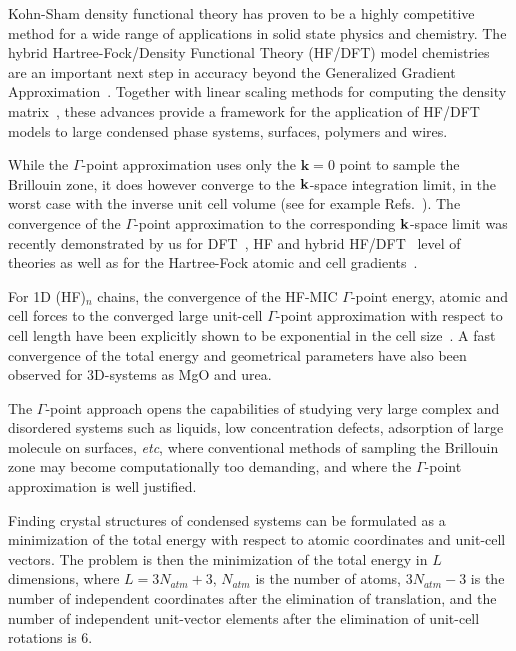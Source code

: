 \documentclass[prl,twocolumn,showpacs,twocolumngrid,superbib]{revtex4}
\begin{document}
Kohn-Sham density functional theory has proven to be a highly 
competitive method for a wide range of applications in solid 
state physics and chemistry.
The hybrid Hartree-Fock/Density Functional Theory (HF/DFT) model chemistries
are an important next step in accuracy beyond the Generalized Gradient
Approximation~\cite{Gill92,Becke93,VBarone96,CAdamo99}. Together with linear
scaling methods for computing the density matrix~\cite{ANiklasson02A,ANiklasson03}, these
advances provide a framework for the application of HF/DFT
models to large condensed phase systems, surfaces, polymers and wires.

While the $\Gamma$-point approximation uses only the $\mathbf{k}=0$ point to sample
the Brillouin zone, it does however converge to the
${\bf k}$-space integration limit, in the worst case with the inverse
unit cell volume (see for example Refs.~\cite{CKittel71,NAshcroft76}).
The convergence of the $\Gamma$-point approximation to
the corresponding ${\bf k}$-space limit was recently
demonstrated by us for DFT~\cite{CTymczak04a}, HF and hybrid
HF/DFT~\cite{CTymczak04b} level of theories as well as for the Hartree-Fock 
atomic and cell gradients~\cite{VWeber05b}.

For 1D (HF)$_n$ chains, the convergence of the HF-MIC $\Gamma$-point energy,
atomic and cell forces to the converged large unit-cell $\Gamma$-point approximation
with respect to cell length have been explicitly shown to be exponential
in the cell size~\cite{VWeber05b}. A fast convergence of the total energy and geometrical parameters
have also been observed for 3D-systems as MgO and urea.

The $\Gamma$-point approach opens the capabilities of studying very large
complex and disordered systems such as liquids, low concentration defects, adsorption of
large molecule on surfaces, {\em etc}, where conventional methods
of sampling the Brillouin zone may become computationally too demanding, and
where the $\Gamma$-point approximation is well justified.

Finding crystal structures of condensed systems can
be formulated as a minimization of the total energy
with respect to atomic coordinates and unit-cell vectors.
The problem is then the minimization of the total energy in $L$ dimensions, where
$L=3N_{atm}+3$, $N_{atm}$ is the number of atoms, $3N_{atm}-3$ is the number
of independent coordinates after the elimination of translation,
and the number of independent unit-vector elements
after the elimination of unit-cell rotations is 6.
\end{document}
